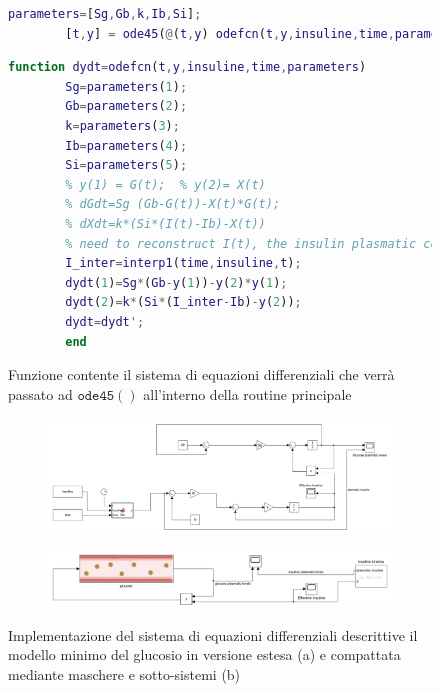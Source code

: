 \begin{figure}[t!]
	\begin{lstlisting}[language=matlab]
		parameters=[Sg,Gb,k,Ib,Si];
		[t,y] = ode45(@(t,y) odefcn(t,y,insuline,time,parameters), [time(1), time(end)],[G0,x0]);	
	\end{lstlisting}
	\caption{Snippet della routine principale per la soluzione del sistema di equazioni differenziali in Matlab}
	\label{fig:code1}
	\vspace{1cm}
	\begin{lstlisting}[language=matlab]
		function dydt=odefcn(t,y,insuline,time,parameters)
		Sg=parameters(1);
		Gb=parameters(2);
		k=parameters(3);
		Ib=parameters(4);
		Si=parameters(5);
		% y(1) = G(t); 	% y(2)= X(t)
		% dGdt=Sg (Gb-G(t))-X(t)*G(t); 	
		% dXdt=k*(Si*(I(t)-Ib)-X(t)) 
		% need to reconstruct I(t), the insulin plasmatic concentration, ODE solver need I(t) at every t. Interpolation in the same variabile of the ode solver (t). 
		I_inter=interp1(time,insuline,t);
		dydt(1)=Sg*(Gb-y(1))-y(2)*y(1);
		dydt(2)=k*(Si*(I_inter-Ib)-y(2));
		dydt=dydt'; 
		end
	\end{lstlisting}
	\caption{Funzione contente il sistema di equazioni differenziali che verrà passato ad $\mathtt{ode45()}$ all'interno della routine principale}
	\label{fig:code2}
\end{figure}

\begin{figure}[t!]
	\begin{subfigure}{0.95\linewidth}
		\centering
		\includegraphics[width=0.85\linewidth]{figures/simulink_extended}
		\caption{}
		\label{fig:simulinkextended}
	\end{subfigure}
	\begin{subfigure}{0.95\linewidth}
		\centering
		\includegraphics[width=0.85\linewidth]{figures/simulink}
		\caption{}
		\label{fig:simulinkcompact}
	\end{subfigure}
	\caption{Implementazione del sistema di equazioni differenziali descrittive il modello minimo del glucosio in versione estesa (a) e compattata mediante maschere e sotto-sistemi (b)}
	\label{fig:simulink}
\end{figure}


